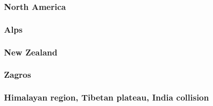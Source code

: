\cite{wdbo94b}
\cite{basv06}
\cite{robn16}

\subsubsection*{North America} 

\cite{bugm97}

\subsubsection*{Alps} 

\cite{pfsb02}
\cite{buge05}
\cite{luws13}
\cite{scdu15}

\subsubsection*{New Zealand} 

\cite{koon90}
\cite{brbe95}
\cite{bekh96}
\cite{babr99}
\cite{libi06}
\cite{gedh02}\cite{pybf02}
\cite{gehd03}\cite{konc03}\cite{upke03}
\cite{pyeg10}
\cite{grel12}

\subsubsection*{Zagros}

\cite{vech06}
\cite{hamo10}
\cite{yakm11}
\cite{nipc13}
\cite{frba14}
\cite{ghbu14}
\cite{rugb17}

\subsubsection*{Himalayan region, Tibetan plateau, India collision} 

